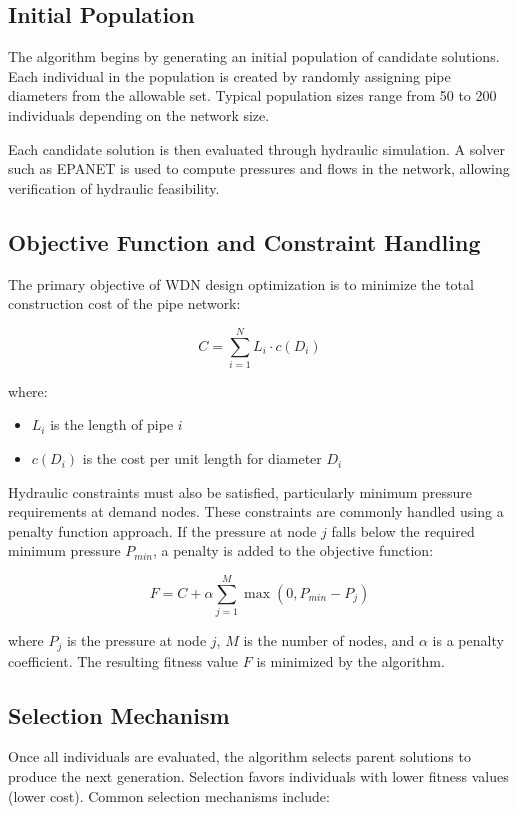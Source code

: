 \documentclass[12pt, a4paper]{article}
\begin{document}
\subsection*{Initial Population}

The algorithm begins by generating an initial population of candidate solutions. Each individual in the population is created by randomly assigning pipe diameters from the allowable set. Typical population sizes range from 50 to 200 individuals depending on the network size.

Each candidate solution is then evaluated through hydraulic simulation. A solver such as EPANET is used to compute pressures and flows in the network, allowing verification of hydraulic feasibility.

\subsection*{Objective Function and Constraint Handling}

The primary objective of WDN design optimization is to minimize the total construction cost of the pipe network:

\[
	C = \sum_{i=1}^{N} L_i \cdot c(D_i)
\]

where:
\begin{itemize}
	\item $L_i$ is the length of pipe $i$
	\item $c(D_i)$ is the cost per unit length for diameter $D_i$
\end{itemize}

Hydraulic constraints must also be satisfied, particularly minimum pressure requirements at demand nodes. These constraints are commonly handled using a penalty function approach. If the pressure at node $j$ falls below the required minimum pressure $P_{min}$, a penalty is added to the objective function:

\[
	F = C + \alpha \sum_{j=1}^{M} \max(0, P_{min} - P_j)
\]

where $P_j$ is the pressure at node $j$, $M$ is the number of nodes, and $\alpha$ is a penalty coefficient. The resulting fitness value $F$ is minimized by the algorithm.

\subsection*{Selection Mechanism}

Once all individuals are evaluated, the algorithm selects parent solutions to produce the next generation. Selection favors individuals with lower fitness values (lower cost). Common selection mechanisms include:
\end{document}
